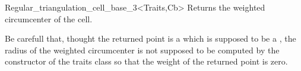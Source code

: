 \begin{ccRefClass}{Regular_triangulation_cell_base_3<Traits,Cb>}
{Returns the weighted circumcenter of the cell.}

Be carefull that, thought the returned point is a
which is supposed to be a ,
the radius of the  weighted circumcenter is not supposed to be
computed
by the constructor   of the traits
class
so that the weight of the returned point is zero.


\ccSeeAlso
{} \\
 \\
\\


\end{ccRefClass}



